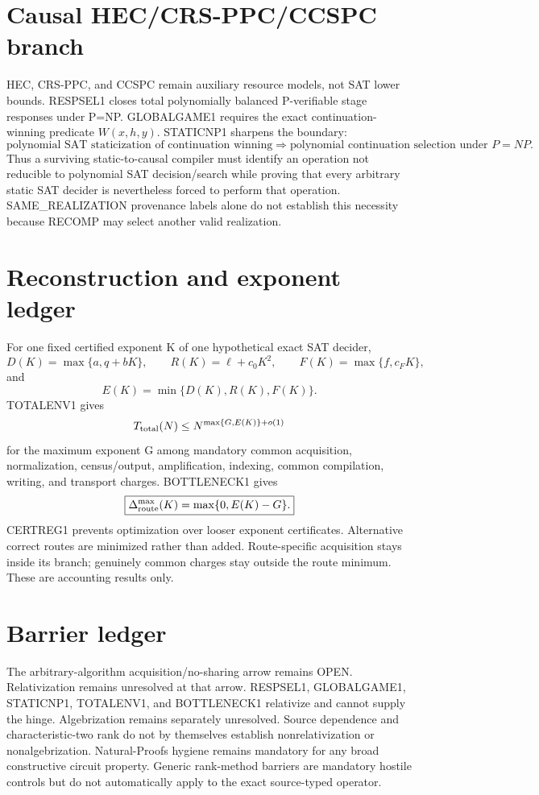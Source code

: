 \documentclass[11pt]{article}
\begin{document}
\section*{Causal HEC/CRS-PPC/CCSPC branch}
HEC, CRS-PPC, and CCSPC remain auxiliary resource models, not SAT lower bounds. RESPSEL1 closes total polynomially balanced P-verifiable stage responses under P=NP. GLOBALGAME1 requires the exact continuation-winning predicate \(W(x,h,y)\). STATICNP1 sharpens the boundary:
\[
\boxed{\text{polynomial SAT staticization of continuation winning}
\Longrightarrow
\text{polynomial continuation selection under }P=NP.}
\]
Thus a surviving static-to-causal compiler must identify an operation not reducible to polynomial SAT decision/search while proving that every arbitrary static SAT decider is nevertheless forced to perform that operation. SAME\_REALIZATION provenance labels alone do not establish this necessity because RECOMP may select another valid realization.

\section*{Reconstruction and exponent ledger}
For one fixed certified exponent K of one hypothetical exact SAT decider,
\[
D(K)=\max\{a,q+bK\},\qquad
R(K)=\ell+c_0K^2,\qquad
F(K)=\max\{f,c_FK\},
\]
and
\[
E(K)=\min\{D(K),R(K),F(K)\}.
\]
TOTALENV1 gives
\[
T_{\rm total}(N)\le N^{\max\{G,E(K)\}+o(1)}
\]
for the maximum exponent G among mandatory common acquisition, normalization, census/output, amplification, indexing, common compilation, writing, and transport charges. BOTTLENECK1 gives
\[
\boxed{\Delta_{\rm route}^{\max}(K)=\max\{0,E(K)-G\}.}
\]
CERTREG1 prevents optimization over looser exponent certificates. Alternative correct routes are minimized rather than added. Route-specific acquisition stays inside its branch; genuinely common charges stay outside the route minimum. These are accounting results only.

\section*{Barrier ledger}
The arbitrary-algorithm acquisition/no-sharing arrow remains OPEN. Relativization remains unresolved at that arrow. RESPSEL1, GLOBALGAME1, STATICNP1, TOTALENV1, and BOTTLENECK1 relativize and cannot supply the hinge. Algebrization remains separately unresolved. Source dependence and characteristic-two rank do not by themselves establish nonrelativization or nonalgebrization. Natural-Proofs hygiene remains mandatory for any broad constructive circuit property. Generic rank-method barriers are mandatory hostile controls but do not automatically apply to the exact source-typed operator.
\end{document}
